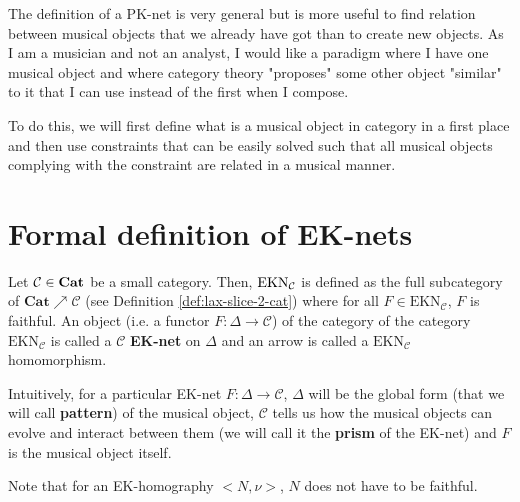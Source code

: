 
The definition of a PK-net is very general but is more useful to find relation between musical objects that we already have got than to create new objects. As I am a musician and not an analyst, I would like a paradigm where I have one musical object and where category theory "proposes" some other object "similar" to it that I can use instead of the first when I compose.

To do this, we will first define what is a musical object in category in a first place and then use constraints that can be easily solved such that all musical objects complying with the constraint are related in a musical manner.




\section{Formal definition of EK-nets}


\begin{defn}
    Let $\mathcal{C}\in \bf Cat$ be a small category. %
     Then, $\bf \text{EKN}_\mathcal{C}$ \label{nomencl:EKN} is defined as the full subcategory of $\textbf{Cat}\nearrow \mathcal{C}$ (see Definition \ref{def:lax-slice-2-cat}) where for all $F\in \text{EKN}_\mathcal{C}$, $F$ is faithful. An object (i.e. a functor $F : \Delta \rightarrow \mathcal{C}$) of the category of the category $\text{EKN}_\mathcal{C}$ is called a $\mathcal{C}$ \textbf{EK-net} on  $\Delta$ and an arrow is called a $\text{EKN}_\mathcal{C}$ homomorphism.
\end{defn}

Intuitively, for a particular EK-net $F : \Delta \rightarrow \mathcal{C}$, $\Delta$ will be the global form (that we will call \textbf{pattern}) of the musical object, $\mathcal{C}$ tells us how the musical objects can evolve and interact between them (we will call it the \textbf{prism} of the EK-net) and  $F$ is the musical object itself.


\begin{rem}
    Note that for an EK-homography $\big<N,\nu\big>$, $N$ does not have to be faithful.
\end{rem}

